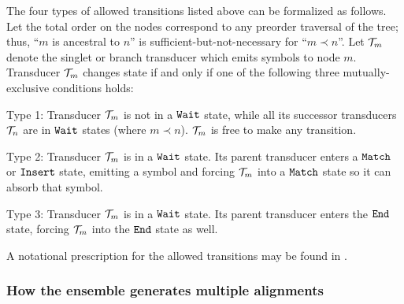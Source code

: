 \documentclass[10pt]{article}
\begin{document}
The four types of allowed transitions listed above can be formalized
as follows.
Let the total order on the nodes correspond to any preorder traversal of
the tree; thus, ``$m$ is ancestral to $n$'' is sufficient-but-not-necessary for ``$m \prec n$''.
Let ${\cal T}_m$ denote the singlet or branch transducer which emits symbols to node $m$.
Transducer ${\cal T}_m$ changes state if and only if one of the
following three mutually-exclusive conditions holds:
\begin{description}
\item{Type 1:} Transducer ${\cal T}_m$ is not in a $\mathtt{Wait}$ state,
  while all its successor transducers ${\cal T}_n$ are in $\mathtt{Wait}$
  states (where $m \prec n$).  ${\cal T}_m$ is free to make any transition.
\item{Type 2:} Transducer ${\cal T}_m$ is in a $\mathtt{Wait}$ state. Its parent transducer enters a $\mathtt{Match}$ or $\mathtt{Insert}$ state, emitting a symbol and forcing ${\cal T}_m$ into a $\mathtt{Match}$ state so it can absorb that symbol.
\item{Type 3:} Transducer ${\cal T}_m$ is in a $\mathtt{Wait}$ state. Its parent transducer enters the $\mathtt{End}$ state, forcing ${\cal T}_m$ into the $\mathtt{End}$ state as well.
\end{description}

A notational prescription for the allowed transitions may be found in .

\subsubsection*{How the ensemble generates multiple alignments}
\end{document}
